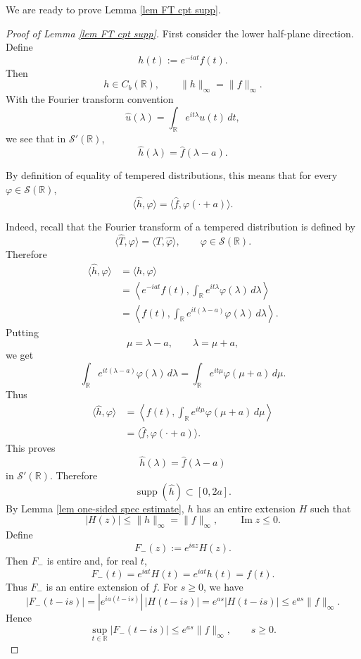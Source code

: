 \documentclass[12pt]{amsart}
\theoremstyle{definition}
\begin{document}
We are ready to prove Lemma \ref{lem FT cpt supp}. 
\begin{proof}[Proof of Lemma \ref{lem FT cpt supp}]
First consider the lower half-plane direction. Define
\[
        h(t):=e^{-iat}f(t).
\]
Then
\[
        h\in C_b(\mathbb R),
        \qquad
        \|h\|_\infty=\|f\|_\infty.
\]
With the Fourier transform convention
\[
        \widehat u(\lambda)
        =
        \int_{\mathbb R}e^{it\lambda}u(t)\,dt,
\]
we see that in \(\mathcal S'(\mathbb R)\),
\[
        \widehat h(\lambda)
        =
        \widehat f(\lambda-a).
\]

By definition of equality of tempered distributions, this means that for every
\(\varphi\in\mathcal S(\mathbb R)\),
\[
        \langle \widehat h,\varphi\rangle
        =
        \langle \widehat f,\varphi(\cdot+a)\rangle .
\]

Indeed, recall that the Fourier transform of a tempered distribution is defined by
\[
        \langle \widehat T,\varphi\rangle
        =
        \langle T,\widehat\varphi\rangle,
        \qquad \varphi\in\mathcal S(\mathbb R).
\]
Therefore
\[
\begin{aligned}
        \langle \widehat h,\varphi\rangle
        &=
        \langle h,\widehat\varphi\rangle                                      \\
        &=
        \left\langle e^{-iat}f(t),
        \int_{\mathbb R}e^{it\lambda}\varphi(\lambda)\,d\lambda
        \right\rangle                                                         \\
        &=
        \left\langle f(t),
        \int_{\mathbb R}e^{it(\lambda-a)}\varphi(\lambda)\,d\lambda
        \right\rangle .
\end{aligned}
\]
Putting
\[
        \mu=\lambda-a,
        \qquad \lambda=\mu+a,
\]
we get
\[
        \int_{\mathbb R}e^{it(\lambda-a)}\varphi(\lambda)\,d\lambda
        =
        \int_{\mathbb R}e^{it\mu}\varphi(\mu+a)\,d\mu.
\]
Thus
\[
\begin{aligned}
        \langle \widehat h,\varphi\rangle
        &=
        \left\langle f(t),
        \int_{\mathbb R}e^{it\mu}\varphi(\mu+a)\,d\mu
        \right\rangle                                                         \\
        &=
        \langle \widehat f,\varphi(\cdot+a)\rangle .
\end{aligned}
\]
This proves
\[
        \widehat h(\lambda)=\widehat f(\lambda-a)
\]
in \(\mathcal S'(\mathbb R)\).
Therefore
\[
        \operatorname{supp}(\widehat h)
        \subset [0,2a].
\]
By Lemma \ref{lem one-sided spec estimate}, \(h\) has an entire extension \(H\) such
that
\[
        |H(z)|\le \|h\|_\infty=\|f\|_\infty,
        \qquad \operatorname{Im}z\le 0.
\]
Define
\[
        F_-(z):=e^{iaz}H(z).
\]
Then \(F_-\) is entire and, for real \(t\),
\[
        F_-(t)
        =
        e^{iat}H(t)
        =
        e^{iat}h(t)
        =
        f(t).
\]
Thus \(F_-\) is an entire extension of \(f\). For \(s\ge 0\), we have
\[
        |F_-(t-is)|
        =
        |e^{ia(t-is)}|\,|H(t-is)|
        =
        e^{as}|H(t-is)|
        \le
        e^{as}\|f\|_\infty .
\]
Hence
\[
        \sup_{t\in\mathbb R}|F_-(t-is)|
        \le
        e^{as}\|f\|_\infty,
        \qquad s\ge 0.
\]


\end{proof}
\end{document}
